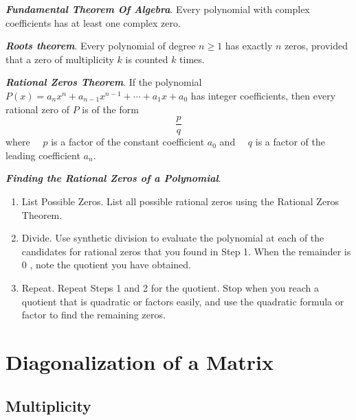 \documentclass{report}
\begin{document}
    \begin{thBox}
        \textit{\textbf{Fundamental Theorem Of Algebra}}. Every polynomial with complex coefficients has at least one complex zero.
    \end{thBox}

    \begin{thBox}
        \textit{\textbf{Roots theorem}}. Every polynomial of degree $n \geq 1$ has exactly $n$ zeros, provided that a zero of multiplicity $k$ is counted $k$ times.
    \end{thBox}

    \begin{thBox}
        \textit{\textbf{Rational Zeros Theorem}}. If the polynomial $P(x)=a_n x^n+a_{n-1} x^{n-1}+\cdots+a_1 x+a_0$ has integer coefficients, then every rational zero of $P$ is of the form
        $$
        \frac{p}{q}
        $$
        where $\quad p$ is a factor of the constant coefficient $a_0$
        and $\quad q$ is a factor of the leading coefficient $a_n$.
    \end{thBox}

    \begin{noteBox}
        \textit{\textbf{Finding the Rational Zeros of a Polynomial}}.
        \begin{enumerate}
            \item List Possible Zeros. List all possible rational zeros using the Rational Zeros Theorem.
            \item Divide. Use synthetic division to evaluate the polynomial at each of the candidates for rational zeros that you found in Step 1. When the remainder is 0 , note the quotient you have obtained.
            \item Repeat. Repeat Steps 1 and 2 for the quotient. Stop when you reach a quotient that is quadratic or factors easily, and use the quadratic formula or factor to find the remaining zeros.
        \end{enumerate}
    \end{noteBox}

    \section{Diagonalization of a Matrix}

    \subsection*{Multiplicity}
\end{document}
